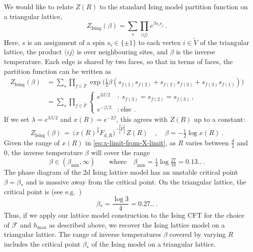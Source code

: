 \documentclass[11pt,a4paper]{article}
\numberwithin{equation}{section}
\begin{document}
We would like to relate $Z(R)$ to the standard Ising model partition function on a triangular lattice,
\begin{equation}
    Z_\text{Ising}(\beta) = \sum_{s} \prod_{\langle ij \rangle} e^{\beta s_i s_j} \ .
\end{equation}
Here, $s$ is an assignment of a spin $s_i \in \{ \pm 1 \}$ to each vertex $i \in \tilde V$ of the triangular lattice, the product $\langle ij \rangle$ is over neighbouring sites, and $\beta$ is the inverse temperature. Each edge is shared by two faces, so that in terms of faces, the partition function can be written as
\begin{align}
    Z_\text{Ising}(\beta) 
    &= \sum_{s} 
    \prod_{f \in \tilde F}
    \exp\big( \tfrac12 \beta( s_{f(1)}s_{f(2)} + s_{f(2)}s_{f(3)} + s_{f(3)}s_{f(1)} ) \big) 
    \nonumber \\
    &=
    \sum_s \prod_{f \in \tilde F}
    \begin{cases}
        e^{3\beta/2} &:~ s_{f(3)} = s_{f(2)} = s_{f(3)}  \ ,
        \\
        e^{-\beta/2} &:~ \text{else .}
    \end{cases}
\end{align}
If we set $\lambda = e^{3 \beta / 2}$ and $x(R) = e^{-2\beta}$, this agrees with $Z(R)$ up to a constant:
\begin{equation}\label{eq:relation-Ising-lattice}
    Z_\text{Ising}(\beta)
    \,=\, \big(x(R)^{\frac34} F_{d,R}\big)^{-|\tilde F|}
    \, Z(R)
    \quad , \quad
    \beta = -\tfrac12 \log x(R) \ .
\end{equation}
Given the range of $x(R)$ in \eqref{eq:x-limit-from-X-limit}, as $R$ varies between $\frac d2$ and $0$, the inverse temperature $\beta$ will cover the range
%
\begin{equation}
    \beta \in (\beta_\text{min},\infty)
    \qquad \text{where} \quad
    \beta_\text{min} = \tfrac14 \log \tfrac{27}{16} = 0.13..
    \ .
\end{equation}
The phase diagram of the 2d Ising lattice model has an unstable critical point $\beta = \beta_*$ and is massive away from the critical point. On the triangular lattice, the critical point is (see e.g.\ \cite[Sec.\,4.5]{Mussardo-book})
\begin{equation}
    \beta_* = \frac{\log 3}{4} = 0.27..
    \ .
\end{equation}
Thus, 
if we apply our lattice model construction to the Ising CFT for the choice of $\mathcal{F}$ and $h_\text{max}$ as described above, we recover the Ising lattice model on a triangular lattice. The range of inverse temperatures $\beta$ covered by varying $R$ includes the critical point $\beta_*$ of the Ising model on a triangular lattice.
\end{document}
